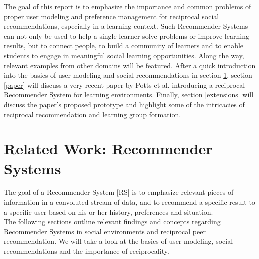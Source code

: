 \documentclass[conference]{IEEEtran}
\begin{document}
The goal of this report is to emphasize the importance and common problems of proper user modeling and preference management for reciprocal social recommendations, especially in a learning context. Such Recommender Systems can not only be used to help a single learner solve problems or improve learning results, but to connect people, to build a community of learners and to enable students to engage in meaningful social learning opportunities. Along the way, relevant examples from other domains will be featured. After a quick introduction into the basics of user modeling and social recommendations in section \ref{relatedwork}, section \ref{paper} will discuss a very recent paper by Potts et al. introducing a reciprocal Recommender System for learning environments. \cite{potts2018reciprocal} Finally, section \ref{extensions} will discuss the paper's proposed prototype and highlight some of the intricacies of reciprocal recommendation and learning group formation.\\

\section{Related Work: Recommender Systems} \label{relatedwork}

The goal of a Recommender System [RS] is to emphasize relevant pieces of information in a convoluted stream of data, and to recommend a specific result to a specific user based on his or her history, preferences and situation. \cite{ricci2011introduction}\\
The following sections outline relevant findings and concepts regarding Recommender Systems in social environments and reciprocal peer recommendation. We will take a look at the basics of user modeling, social recommendations and the importance of reciprocality.
\end{document}
